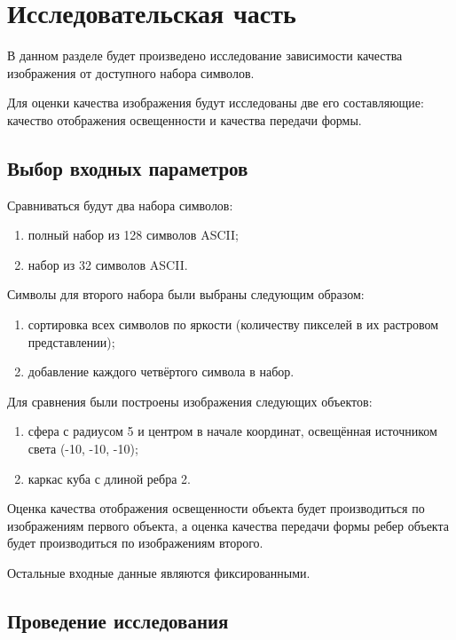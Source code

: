 \chapter{Исследовательская часть}

В данном разделе будет произведено исследование зависимости качества изображения от доступного набора символов.

Для оценки качества изображения будут исследованы две его составляющие: качество отображения освещенности и качества передачи формы.

\section{Выбор входных параметров}

Сравниваться будут два набора символов:
\begin{enumerate}
    \item полный набор из 128 символов ASCII;
    \item набор из 32 символов ASCII.
\end{enumerate}

Символы для второго набора были выбраны следующим образом:
\begin{enumerate}
    \item сортировка всех символов по яркости (количеству пикселей в их растровом представлении);
    \item добавление каждого четвёртого символа в набор.
\end{enumerate}

Для сравнения были построены изображения следующих объектов:
\begin{enumerate}
    \item сфера с радиусом 5 и центром в начале координат, освещённая источником света (-10, -10, -10);
    \item каркас куба с длиной ребра 2.
\end{enumerate}

Оценка качества отображения освещенности объекта будет производиться по изображениям первого объекта, а оценка качества передачи формы ребер объекта будет производиться по изображениям второго.

Остальные входные данные являются фиксированными.

\section{Проведение исследования}

